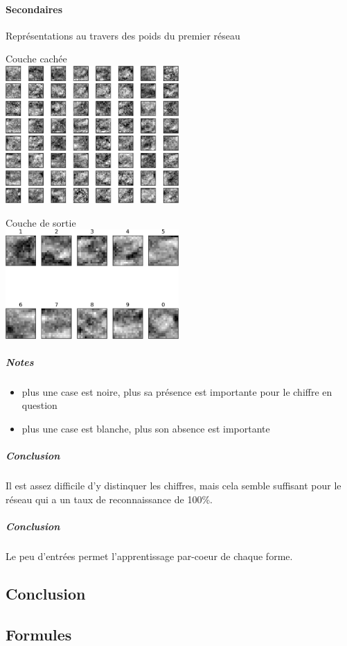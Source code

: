     \paragraph{Secondaires}
      Représentations au travers des poids du premier réseau
      \begin{center}
	Couche cachée \\
	\includegraphics[width=250px]{data/expA3/representation_hidden.png}
      \end{center}
      \begin{center}
	Couche de sortie \\
	\includegraphics[width=250px]{data/expA3/representation.png}
      \end{center} 
      \subparagraph{Notes}
	\begin{itemize}
	  \item plus une case est noire, plus sa présence est importante pour le chiffre en question
	  \item plus une case est blanche, plus son absence est importante
	\end{itemize}
      \subparagraph{Conclusion}
	Il est assez difficile d'y distinquer les chiffres, mais cela semble suffisant pour le réseau
	qui a un taux de reconnaissance de 100\%.

      \subparagraph{Conclusion}
	Le peu d'entrées permet l'apprentissage par-coeur de chaque forme.
	


  \subsection{Conclusion}
  
  

  \newpage 
  \subsection{Formules}
    
    
    



